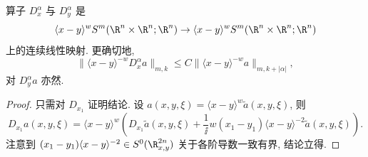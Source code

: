\begin{lemma}[加权符号的微分]\label{lem:4.5}
算子 $D_x^\alpha$ 与 $D_y^\alpha$ 是
\[
    \langle x - y \rangle^w S^m(\R^n \times \R^n; \R^n) \to \langle x - y \rangle^w S^m(\R^n \times \R^n; \R^n)
\]
上的连续线性映射. 更确切地,
\begin{equation}\label{eq:4.12}
    \|\langle x - y \rangle^{-w} D_x^\alpha a\|_{m, k} \le C \|\langle x - y \rangle^{-w} a\|_{m, k + |\alpha|},
\end{equation}
对 $D_y^\alpha a$ 亦然.
\end{lemma}

\begin{proof}
只需对 $D_{x_1}$ 证明结论. 设 $a(x, y, \xi) = \langle x - y \rangle^w \tilde{a}(x, y, \xi)$, 则
\begin{equation}\label{eq:4.13}
    D_{x_1} a(x, y, \xi) = \langle x - y \rangle^w \left( D_{x_1} \tilde{a}(x, y, \xi) + \frac{1}{\ii} w (x_1 - y_1) \langle x - y \rangle^{-2} \tilde{a}(x, y, \xi) \right).
\end{equation}
注意到 $(x_1 - y_1) \langle x - y \rangle^{-2} \in S^0(\R_{x, y}^{2n})$ 关于各阶导数一致有界, 结论立得.
\end{proof}

